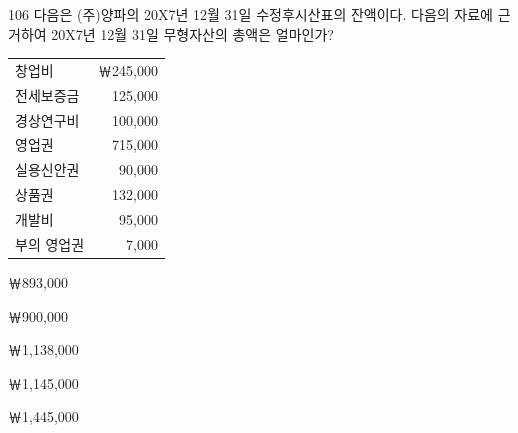 \begin{question}{106}
다음은 (주)양파의 20X7년 12월 31일 수정후시산표의 잔액이다. 다음의 자료에 근거하여 20X7년 12월 31일 무형자산의 총액은 얼마인가?

{\small\centering
\begin{tabular}{|lr|}
\hline
창업비 & ￦245,000 \\
전세보증금 & 125,000 \\
경상연구비 & 100,000 \\
영업권 & 715,000 \\
실용신안권 & 90,000 \\
상품권 & 132,000 \\
개발비 & 95,000 \\
부의 영업권 & 7,000 \\
\hline
\end{tabular}\par}

\begin{choices}
  \item ￦893,000
  \item ￦900,000
  \item ￦1,138,000
  \item ￦1,145,000
  \item ￦1,445,000
\end{choices}
\end{question}
